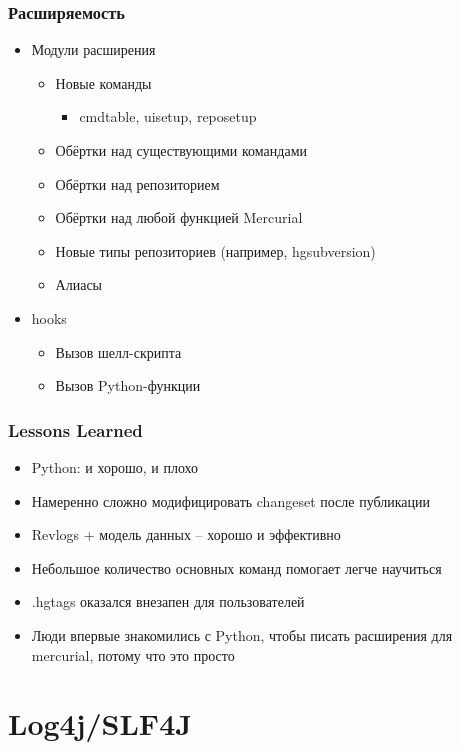 \documentclass[xetex,mathserif,serif]{beamer}
\begin{document}
	\begin{frame}
		\frametitle{Расширяемость}
		\begin{itemize}
			\item Модули расширения
			\begin{itemize}
				\item Новые команды
				\begin{itemize}
					\item cmdtable, uisetup, reposetup
				\end{itemize}
				\item Обёртки над существующими командами
				\item Обёртки над репозиторием
				\item Обёртки над любой функцией Mercurial
				\item Новые типы репозиториев (например, hgsubversion)
				\item Алиасы
			\end{itemize}
			\item hooks
			\begin{itemize}
				\item Вызов шелл-скрипта
				\item Вызов Python-функции
			\end{itemize}
		\end{itemize}
	\end{frame}

	\begin{frame}
		\frametitle{Lessons Learned}
		\begin{itemize}
			\item Python: и хорошо, и плохо
			\item Намеренно сложно модифицировать changeset после публикации
			\item Revlogs + модель данных -- хорошо и эффективно
			\item Небольшое количество основных команд помогает легче научиться
			\item .hgtags оказался внезапен для пользователей
			\item Люди впервые знакомились с Python, чтобы писать расширения для mercurial, потому что это просто
		\end{itemize}
	\end{frame}

	\section{Log4j/SLF4J}
\end{document}
